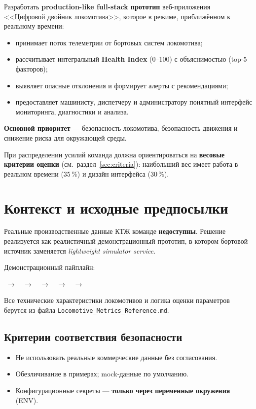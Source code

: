 \documentclass[12pt,a4paper]{article}
\newcommand{\code}[1]{\texttt{#1}}
\begin{document}
Разработать \textbf{production-like full-stack прототип} веб-приложения <<Цифровой двойник локомотива>>, которое в режиме, приближённом к реальному времени:

\begin{itemize}[nosep]
  \item принимает поток телеметрии от бортовых систем локомотива;
  \item рассчитывает интегральный \textbf{Health Index} (0--100) с объяснимостью (top-5 факторов);
  \item выявляет опасные отклонения и формирует алерты с рекомендациями;
  \item предоставляет машинисту, диспетчеру и администратору понятный интерфейс мониторинга, диагностики и анализа.
\end{itemize}

\textbf{Основной приоритет} --- безопасность локомотива, безопасность движения и снижение риска для окружающей среды.

При распределении усилий команда должна ориентироваться на \textbf{весовые критерии оценки} (см.~раздел~\ref{sec:criteria}): наибольший вес имеет работа в реальном времени (35\,\%) и дизайн интерфейса (30\,\%).


\section{Контекст и исходные предпосылки}

Реальные производственные данные КТЖ команде \textbf{недоступны}. Решение реализуется как реалистичный демонстрационный прототип, в котором бортовой источник заменяется \emph{lightweight simulator service}.

Демонстрационный пайплайн:

\begin{center}
 $\;\longrightarrow\;$  $\;\longrightarrow\;$  $\;\longrightarrow\;$  $\;\longrightarrow\;$  $\;\longrightarrow\;$ 
\end{center}

Все технические характеристики локомотивов и логика оценки параметров берутся из файла \code{Locomotive\_Metrics\_Reference.md}.

\subsection{Критерии соответствия безопасности}
\begin{itemize}[nosep]
  \item Не использовать реальные коммерческие данные без согласования.
  \item Обезличивание в примерах; mock-данные по умолчанию.
  \item Конфигурационные секреты --- \textbf{только через переменные окружения} (ENV).
\end{itemize}
\end{document}
